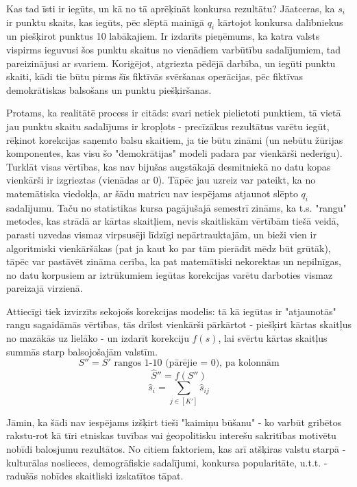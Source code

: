 \documentclass[12pt, a4paper]{article}
\begin{document}
Kas tad īsti ir iegūts, un kā no tā aprēķināt konkursa rezultātu? Jāatceras, ka $s_i$ ir punktu skaits, kas iegūts, pēc slēptā mainīgā $q_i$ kārtojot konkursa dalībniekus un piešķirot punktus 10 labākajiem. Ir izdarīts pieņēmums, ka katra valsts vispirms ieguvusi šos punktu skaitus no vienādiem varbūtību sadalījumiem, tad pareizinājusi ar svariem. Koriģējot, atgriezta pēdējā darbība, un iegūti punktu skaiti, kādi tie būtu pirms šīs fiktīvās svēršanas operācijas, pēc fiktīvas demokrātiskas balsošans un punktu piešķiršanas. 

Protams, ka realitātē process ir citāds: svari netiek pielietoti punktiem, tā vietā jau punktu skaitu sadalījums ir kropļots - precīzākus rezultātus varētu iegūt, rēķinot korekcijas saņemto balsu skaitiem, ja tie būtu zināmi (un nebūtu žūrijas komponentes, kas visu šo "demokrātijas" modeli padara par vienkārši nederīgu). Turklāt visas vērtības, kas nav bijušas augstākajā desmitniekā no datu kopas vienkārši ir izgrieztas (vienādas ar 0). Tāpēc jau uzreiz var pateikt, ka no matemātiska viedokļa, ar šādu matricu nav iespējams atjaunot slēpto $q_i$ sadalījumu. Taču no statistikas kursa pagājušajā semestrī zināms, ka t.s. "rangu" metodes, kas strādā ar kārtas skaitļiem, nevis skaitliskām vērtībām tiešā veidā, parasti uzvedas vismaz virpsusēji līdzīgi nepārtrauktajām, un bieži vien ir algoritmiski vienkāršākas (pat ja kaut ko par tām pierādīt mēdz būt grūtāk), tāpēc var pastāvēt zināma cerība, ka pat matemātiski nekorektas un nepilnīgas, no datu korpusiem ar iztrūkumiem iegūtas korekcijas varētu darboties vismaz pareizajā virzienā.

Attiecīgi tiek izvirzīts sekojošs korekcijas modelis: tā kā iegūtas ir "atjaunotās" rangu sagaidāmās vērtības, tās drīkst vienkārši pārkārtot - piešķirt kārtas skaitļus no mazākās uz lielāko - un izdarīt korekciju $f(s)$, lai svērtu kārtas skaitļus summās starp balsojošajām valstīm.
\begin{equation}
    S'' = S' \text{ rangos 1-10 (pārējie = 0), pa kolonnām}
\end{equation}
\begin{equation}
    \hat S'' = f(S'')
\end{equation}
\begin{equation}
    \hat s_i = \sum_{j \in [K']}\hat s_{ij}
\end{equation}


Jāmin, ka šādi nav iespējams izšķirt tieši "kaimiņu būšanu" - ko varbūt gribētos rakstu-rot kā tīri etniskas tuvības vai ģeopolitisku interešu sakritības motivētu nobīdi balosjumu rezultātos. No citiem faktoriem, kas arī atšķiras valstu starpā - kulturālas noslieces, demogrāfiskie sadalījumi, konkursa popularitāte, u.t.t. - radušās nobīdes skaitliski izskatītos tāpat. 
\end{document}
